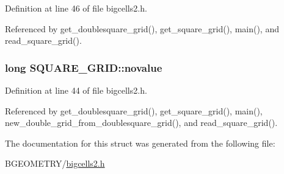 Definition at line 46 of file bigcells2.\-h.



Referenced by get\-\_\-doublesquare\-\_\-grid(), get\-\_\-square\-\_\-grid(), main(), and read\-\_\-square\-\_\-grid().

\hypertarget{struct_s_q_u_a_r_e___g_r_i_d_a45272c3a6d385f45a6f36d6287e20f5d}{
\subsubsection[{novalue}]{\setlength{\rightskip}{0pt plus 5cm}long S\-Q\-U\-A\-R\-E\-\_\-\-G\-R\-I\-D\-::novalue}}\label{struct_s_q_u_a_r_e___g_r_i_d_a45272c3a6d385f45a6f36d6287e20f5d}


Definition at line 44 of file bigcells2.\-h.



Referenced by get\-\_\-doublesquare\-\_\-grid(), get\-\_\-square\-\_\-grid(), main(), new\-\_\-double\-\_\-grid\-\_\-from\-\_\-doublesquare\-\_\-grid(), and read\-\_\-square\-\_\-grid().



The documentation for this struct was generated from the following file\-:\begin{DoxyCompactItemize}
\item 
B\-G\-E\-O\-M\-E\-T\-R\-Y/\hyperlink{bigcells2_8h}{bigcells2.\-h}\end{DoxyCompactItemize}
